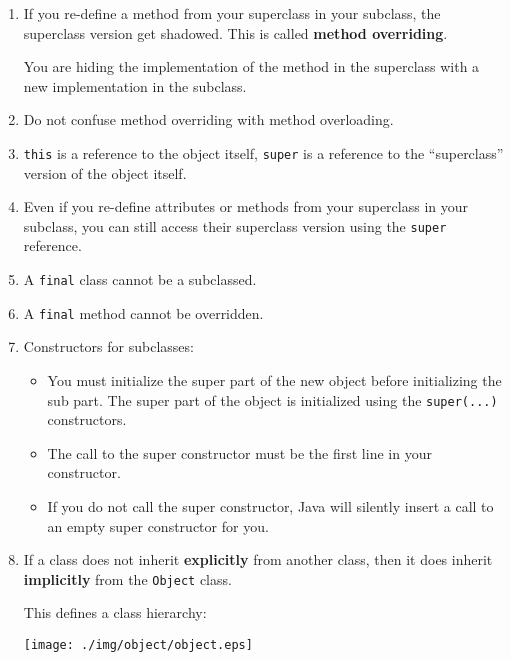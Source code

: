 \documentclass[a4paper, 9pt]{extarticle}
\begin{document}
\begin{enumerate}
  \item If you re-define a method from your superclass in your subclass, the
    superclass version get shadowed. This is called \textbf{method overriding}.

    You are hiding the implementation of the method in the superclass with a
    new implementation in the subclass.

  \item Do not confuse method overriding with method overloading.

  \item \verb+this+ is a reference to the object itself, \verb+super+ is a
    reference to the ``superclass'' version of the object itself.

  \item Even if you re-define attributes or methods from your superclass in
    your subclass, you can still access their superclass version using the
    \verb+super+ reference.

  \item A \verb+final+ class cannot be a subclassed.

  \item A \verb+final+ method cannot be overridden.

  \item Constructors for subclasses:

    \begin{itemize}

      \item You must initialize the super part of the new object before
        initializing the sub part. The super part of the object is initialized
        using the \verb+super(...)+ constructors.

      \item The call to the super constructor must be the first line in your
        constructor.

      \item If you do not call the super constructor, Java will silently insert
        a call to an empty super constructor for you.

    \end{itemize}

  \item If a class does not inherit \textbf{explicitly} from another class,
    then it does inherit \textbf{implicitly} from the \verb+Object+ class.

    This defines a class hierarchy:

    \begin{center}
      \texttt{[image: ./img/object/object.eps]}
    \end{center}


\end{enumerate}
\end{document}
